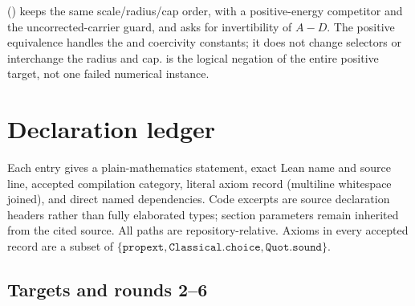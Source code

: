 \texttt{} (\texttt{}) keeps the same scale/radius/cap order, with a positive-energy competitor and the uncorrected-carrier guard, and asks for invertibility of \(A-D\). The positive equivalence handles the \texttt{} and coercivity constants; it does not change selectors or interchange the radius and cap. \texttt{} is the logical negation of the entire positive target, not one failed numerical instance.



\section{Declaration ledger}

Each entry gives a plain-mathematics statement, exact Lean name and source line, accepted compilation category, literal axiom record (multiline whitespace joined), and direct named dependencies. Code excerpts are source declaration headers rather than fully elaborated types; section parameters remain inherited from the cited source. All paths are repository-relative. Axioms in every accepted record are a subset of \(\{\texttt{propext},\texttt{Classical.choice},\texttt{Quot.sound}\}\).



\subsection{Targets and rounds 2–6}

